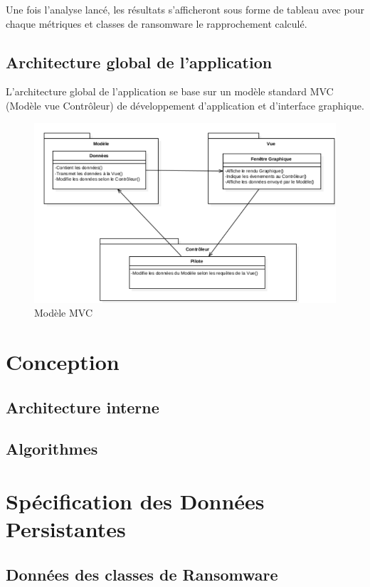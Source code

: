 \documentclass[a4paper, 12pt, twoside]{article}
\begin{document}
Une fois l'analyse lancé, les résultats s'afficheront sous forme de tableau avec pour chaque métriques et classes de ransomware le rapprochement calculé.

\subsection{Architecture global de l'application}
L'architecture global de l'application se base sur un modèle standard MVC (Modèle vue Contrôleur) de développement d'application et d'interface graphique.
\begin{figure}[!h]
\centering
\includegraphics{MVC.pdf}
\caption{Modèle MVC}
\end{figure}

\section{Conception}
\subsection{Architecture interne}


\subsection{Algorithmes}

\section{Spécification des Données Persistantes}
\subsection{Données des classes de Ransomware}
\end{document}
